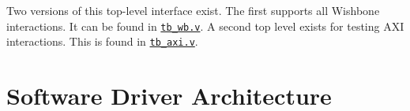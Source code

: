 \documentclass{gqtekspec}
\newcommand{\zhref}[2]{\href{#1}{\textcolor{dkblue}{#2}}}
\begin{document}
Two versions of this top-level interface exist.  The first supports
all Wishbone interactions.  It can be found in
\zhref{../bench/verilog/tb\_wb.v}{\tt tb\_wb.v}.  A second top level exists for
testing AXI interactions.  This is found in
\zhref{../bench/verilog/tb\_axi.v}{\tt tb\_axi.v}.

\section{Software Driver Architecture}\label{sec:arch-swdrvr}
\end{document}
